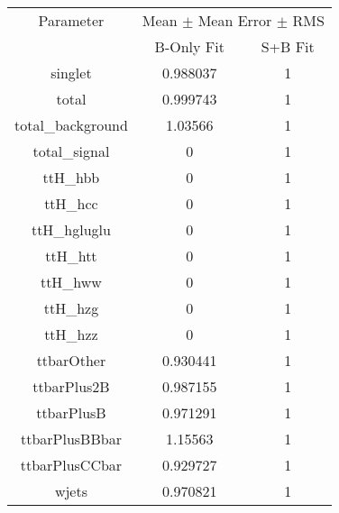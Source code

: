 \begin{table}
\centering

\begin{tabular}{ccc}
\toprule
Parameter & \multicolumn{2}{c}{Mean $\pm$ Mean Error $\pm$ RMS}\\
 & B-Only Fit & S+B Fit\\
\midrule
singlet & \num{0.988037} & \num{1}\\
total & \num{0.999743} & \num{1}\\
total\_background & \num{1.03566} & \num{1}\\
total\_signal & \num{0} & \num{1}\\
ttH\_hbb & \num{0} & \num{1}\\
ttH\_hcc & \num{0} & \num{1}\\
ttH\_hgluglu & \num{0} & \num{1}\\
ttH\_htt & \num{0} & \num{1}\\
ttH\_hww & \num{0} & \num{1}\\
ttH\_hzg & \num{0} & \num{1}\\
ttH\_hzz & \num{0} & \num{1}\\
ttbarOther & \num{0.930441} & \num{1}\\
ttbarPlus2B & \num{0.987155} & \num{1}\\
ttbarPlusB & \num{0.971291} & \num{1}\\
ttbarPlusBBbar & \num{1.15563} & \num{1}\\
ttbarPlusCCbar & \num{0.929727} & \num{1}\\
wjets & \num{0.970821} & \num{1}\\
\bottomrule
\end{tabular}
\end{table}